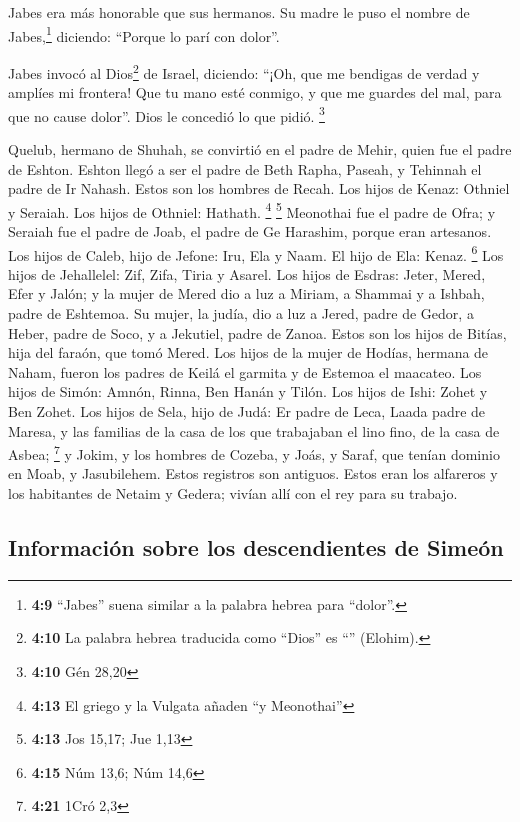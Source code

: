 \begin{paracol}{2}
 Jabes era más honorable que sus hermanos. Su madre le
puso el nombre de Jabes,\footnote{\textbf{4:9} ``Jabes'' suena similar a
  la palabra hebrea para ``dolor''.} diciendo: ``Porque lo parí con
dolor''.

 Jabes invocó al Dios\footnote{\textbf{4:10} La palabra
  hebrea traducida como ``Dios'' es ``'' (Elohim).} de
Israel, diciendo: ``¡Oh, que me bendigas de verdad y amplíes mi
frontera! Que tu mano esté conmigo, y que me guardes del mal, para que
no cause dolor''. Dios le concedió lo que pidió. \footnote{\textbf{4:10}
  Gén 28,20}

 Quelub, hermano de Shuhah, se convirtió en el padre de
Mehir, quien fue el padre de Eshton.  Eshton llegó a ser
el padre de Beth Rapha, Paseah, y Tehinnah el padre de Ir Nahash. Estos
son los hombres de Recah.  Los hijos de Kenaz: Othniel y
Seraiah. Los hijos de Othniel: Hathath. \footnote{\textbf{4:13} El
  griego y la Vulgata añaden ``y Meonothai''} \footnote{\textbf{4:13}
  Jos 15,17; Jue 1,13}  Meonothai fue el padre de Ofra; y
Seraiah fue el padre de Joab, el padre de Ge Harashim, porque eran
artesanos.  Los hijos de Caleb, hijo de Jefone: Iru, Ela
y Naam. El hijo de Ela: Kenaz. \footnote{\textbf{4:15} Núm 13,6; Núm
  14,6}  Los hijos de Jehallelel: Zif, Zifa, Tiria y
Asarel.  Los hijos de Esdras: Jeter, Mered, Efer y Jalón;
y la mujer de Mered dio a luz a Miriam, a Shammai y a Ishbah, padre de
Eshtemoa.  Su mujer, la judía, dio a luz a Jered, padre
de Gedor, a Heber, padre de Soco, y a Jekutiel, padre de Zanoa. Estos
son los hijos de Bitías, hija del faraón, que tomó Mered.
 Los hijos de la mujer de Hodías, hermana de Naham,
fueron los padres de Keilá el garmita y de Estemoa el maacateo.
 Los hijos de Simón: Amnón, Rinna, Ben Hanán y Tilón. Los
hijos de Ishi: Zohet y Ben Zohet.  Los hijos de Sela,
hijo de Judá: Er padre de Leca, Laada padre de Maresa, y las familias de
la casa de los que trabajaban el lino fino, de la casa de Asbea;
\footnote{\textbf{4:21} 1Cró 2,3}  y Jokim, y los hombres
de Cozeba, y Joás, y Saraf, que tenían dominio en Moab, y Jasubilehem.
Estos registros son antiguos.  Estos eran los alfareros y
los habitantes de Netaim y Gedera; vivían allí con el rey para su
trabajo.

\hypertarget{informaciuxf3n-sobre-los-descendientes-de-simeuxf3n}{%
\subsection{Información sobre los descendientes de
Simeón}\label{informaciuxf3n-sobre-los-descendientes-de-simeuxf3n}}


\end{paracol}
